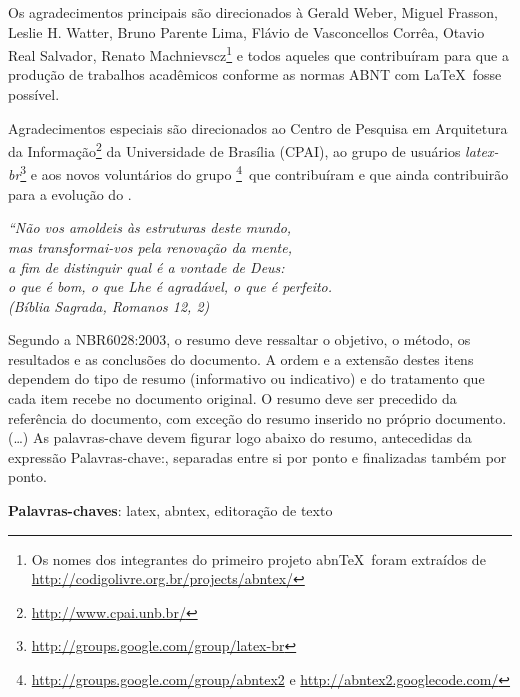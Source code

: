 \documentclass[
	12pt,                       %
	oneside,                    %
	a4paper,                    %
	chapter=TITLE,              %
	section=TITLE,              %
	brazil                      %
    sumario=tradicional         %
]{abntex2}
\begin{document}

\begin{agradecimentos}
  Os agradecimentos principais são direcionados à Gerald Weber, Miguel Frasson,
  Leslie H. Watter, Bruno Parente Lima, Flávio de Vasconcellos Corrêa, Otavio Real
  Salvador, Renato Machnievscz\footnote{Os nomes dos integrantes do primeiro
  projeto abn\TeX\ foram extraídos de
  \url{http://codigolivre.org.br/projects/abntex/}} e todos aqueles que
  contribuíram para que a produção de trabalhos acadêmicos conforme
  as normas ABNT com \LaTeX\ fosse possível.

  Agradecimentos especiais são direcionados ao Centro de Pesquisa em Arquitetura
  da Informação\footnote{\url{http://www.cpai.unb.br/}} da Universidade de
  Brasília (CPAI), ao grupo de usuários
  \emph{latex-br}\footnote{\url{http://groups.google.com/group/latex-br}} e aos
  novos voluntários do grupo
  \emph{\abnTeX}\footnote{\url{http://groups.google.com/group/abntex2} e
  \url{http://abntex2.googlecode.com/}}~que contribuíram e que ainda
  contribuirão para a evolução do \abnTeX.

\end{agradecimentos}


\begin{epigrafe}
  \vspace*{\fill}
  \begin{flushright}
    \textit{``Não vos amoldeis às estruturas deste mundo, \\
 	mas transformai-vos pela renovação da mente, \\
 	a fim de distinguir qual é a vontade de Deus: \\
 	o que é bom, o que Lhe é agradável, o que é perfeito.\\
 	(Bíblia Sagrada, Romanos 12, 2)}
  \end{flushright}
\end{epigrafe}


\begin{resumo}
  Segundo a NBR6028:2003, o resumo deve ressaltar o objetivo, o método, os
  resultados e as conclusões do documento. A ordem e a extensão destes itens
  dependem do tipo de resumo (informativo ou indicativo) e do tratamento que
  cada item recebe no documento original. O resumo deve ser precedido da
  referência do documento, com exceção do resumo inserido no próprio documento.
  (\ldots) As palavras-chave devem figurar logo abaixo do resumo, antecedidas
  da expressão Palavras-chave:, separadas entre si por ponto e finalizadas
  também por ponto.

  \vspace{\onelineskip}
  \noindent
  \textbf{Palavras-chaves}: latex, abntex, editoração de texto
\end{resumo}
\end{document}

